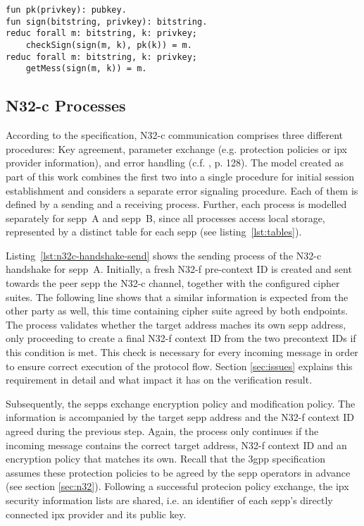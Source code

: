 \begin{lstlisting}[caption={Definition of custom constructors and destructors},label={lst:destructors},firstnumber=112]
fun pk(privkey): pubkey.
fun sign(bitstring, privkey): bitstring.
reduc forall m: bitstring, k: privkey;
    checkSign(sign(m, k), pk(k)) = m.
reduc forall m: bitstring, k: privkey;
    getMess(sign(m, k)) = m.
\end{lstlisting}

\subsection{N32-c Processes}

According to the specification, N32-c communication comprises three different procedures: Key agreement, parameter exchange (e.g. protection policies or \gls{ipx} provider information), and error handling (c.f. \cite{3gpp.33.501}, p. 128).
The model created as part of this work combines the first two into a single procedure for initial session establishment and considers a separate error signaling procedure.
Each of them is defined by a sending and a receiving process.
Further, each process is modelled separately for \gls{sepp}~A and \gls{sepp}~B, since all processes access local storage, represented by a distinct table for each \gls{sepp} (see listing~\ref{lst:tables}).

Listing~\ref{lst:n32c-handshake-send} shows the sending process of the N32-c handshake for \gls{sepp}~A.
Initially, a fresh N32-f pre-context ID is created and sent towards the peer \gls{sepp} the N32-c channel, together with the configured cipher suites.
The following line shows that a similar information is expected from the other party as well, this time containing cipher suite agreed by both endpoints.
The process validates whether the target address maches its own \gls{sepp} address, only proceeding to create a final N32-f context ID from the two precontext IDs if this condition is met.
This check is necessary for every incoming message in order to ensure correct execution of the protocol flow.
Section \ref{sec:issues} explains this requirement in detail and what impact it has on the verification result.

Subsequently, the \glspl{sepp} exchange encryption policy and modification policy.
The information is accompanied by the target \gls{sepp} address and the N32-f context ID agreed during the previous step.
Again, the process only continues if the incoming message contains the correct target address, N32-f context ID and an encryption policy that matches its own.
Recall that the \gls{3gpp} specification assumes these protection policies to be agreed by the \gls{sepp} operators in advance (see section \ref{sec:n32}).
Following a successful protecion policy exchange, the \gls{ipx} security information lists are shared, i.e. an identifier of each \gls{sepp}'s directly connected \gls{ipx} provider and its public key.

